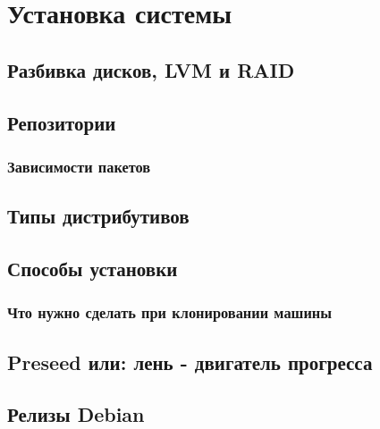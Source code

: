 \chapter{Установка системы}
\section{Разбивка дисков, LVM и RAID}
\section{Репозитории}
\subsection{Зависимости пакетов}
\section{Типы дистрибутивов}
\section{Способы установки}
\subsection{Что нужно сделать при клонировании машины}
\section{Preseed или: лень - двигатель прогресса}
\section{Релизы Debian}
